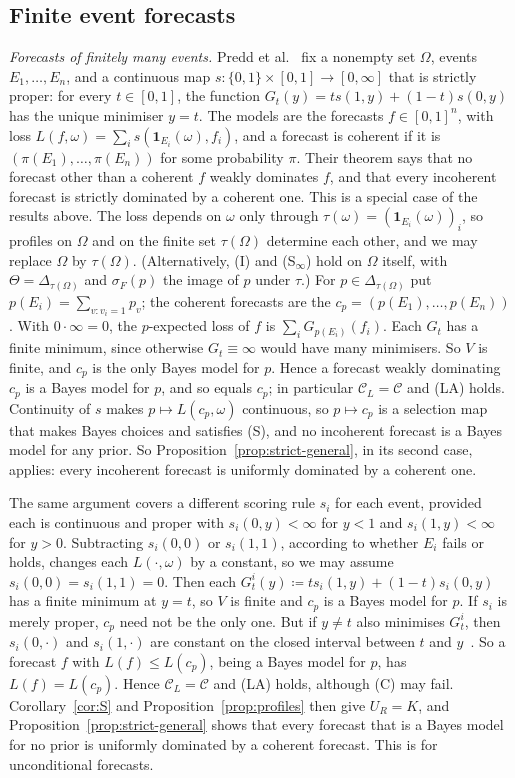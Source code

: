 \documentclass[11pt]{article}
\theoremstyle{definition}
\theoremstyle{remark}
\newcommand{\C}{\mathcal C}
\newcommand{\one}{\mathbf 1}
\begin{document}
\subsection{Finite event forecasts}\label{sec:forecasts}
\emph{Forecasts of finitely many events.} Predd et al.~\cite[Theorem~1]{Predd} fix a nonempty set $\Omega$, events $E_1,\dots,E_n$, and a continuous map $s:\{0,1\}\times[0,1]\to[0,\infty]$ that is strictly proper: for every $t\in[0,1]$, the function $G_t(y)=ts(1,y)+(1-t)s(0,y)$ has the unique minimiser $y=t$. The models are the forecasts $f\in[0,1]^n$, with loss $L(f,\omega)=\sum_is(\one_{E_i}(\omega),f_i)$, and a forecast is coherent if it is $(\pi(E_1),\dots,\pi(E_n))$ for some probability $\pi$. Their theorem says that no forecast other than a coherent $f$ weakly dominates $f$, and that every incoherent forecast is strictly dominated by a coherent one. This is a special case of the results above. The loss depends on $\omega$ only through $\tau(\omega)=(\one_{E_i}(\omega))_i$, so profiles on $\Omega$ and on the finite set $\tau(\Omega)$ determine each other, and we may replace $\Omega$ by $\tau(\Omega)$. (Alternatively, (I) and (S$_\infty$) hold on $\Omega$ itself, with $\Theta=\Delta_{\tau(\Omega)}$ and $\sigma_F(p)$ the image of $p$ under $\tau$.) For $p\in\Delta_{\tau(\Omega)}$ put $p(E_i)=\sum_{v:v_i=1}p_v$; the coherent forecasts are the $c_p=(p(E_1),\dots,p(E_n))$. With $0\cdot\infty=0$, the $p$-expected loss of $f$ is $\sum_iG_{p(E_i)}(f_i)$. Each $G_t$ has a finite minimum, since otherwise $G_t\equiv\infty$ would have many minimisers. So $V$ is finite, and $c_p$ is the only Bayes model for $p$. Hence a forecast weakly dominating $c_p$ is a Bayes model for $p$, and so equals $c_p$; in particular $\C_L=\C$ and (LA) holds. Continuity of $s$ makes $p\mapsto L(c_p,\omega)$ continuous, so $p\mapsto c_p$ is a selection map that makes Bayes choices and satisfies (S), and no incoherent forecast is a Bayes model for any prior. So Proposition~\ref{prop:strict-general}, in its second case, applies: every incoherent forecast is uniformly dominated by a coherent one.

The same argument covers a different scoring rule $s_i$ for each event, provided each is continuous and proper with $s_i(0,y)<\infty$ for $y<1$ and $s_i(1,y)<\infty$ for $y>0$. Subtracting $s_i(0,0)$ or $s_i(1,1)$, according to whether $E_i$ fails or holds, changes each $L(\cdot,\omega)$ by a constant, so we may assume $s_i(0,0)=s_i(1,1)=0$. Then each $G^i_t(y)\coloneqq ts_i(1,y)+(1-t)s_i(0,y)$ has a finite minimum at $y=t$, so $V$ is finite and $c_p$ is a Bayes model for $p$. If $s_i$ is merely proper, $c_p$ need not be the only one. But if $y\ne t$ also minimises $G^i_t$, then $s_i(0,\cdot)$ and $s_i(1,\cdot)$ are constant on the closed interval between $t$ and $y$~\cite[Lemma~5]{SSK09}. So a forecast $f$ with $L(f)\le L(c_p)$, being a Bayes model for $p$, has $L(f)=L(c_p)$. Hence $\C_L=\C$ and (LA) holds, although (C) may fail. Corollary~\ref{cor:S} and Proposition~\ref{prop:profiles} then give $U_R=K$, and Proposition~\ref{prop:strict-general} shows that every forecast that is a Bayes model for no prior is uniformly dominated by a coherent forecast. This is \cite[Theorem~2, Conclusion~3]{SSK09} for unconditional forecasts.
\end{document}
